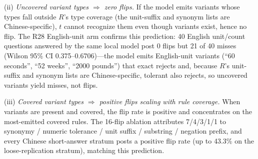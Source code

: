 \documentclass[10pt]{article} %
\begin{document}
(ii) \emph{Uncovered variant types $\Rightarrow$ zero flips.} If the model emits variants whose types fall outside $R$'s type coverage (the unit-suffix and synonym lists are Chinese-specific), $t$ cannot recognize them even though variants exist, hence no flip. The R28 English-unit arm confirms this prediction: 40 English unit/count questions answered by the same local model post 0 flips but 21 of 40 misses (Wilson 95\% CI 0.375--0.6706)---the model emits English-unit variants (``60 seconds'', ``52 weeks'', ``2000 pounds'') that exact rejects and, because $R$'s unit-suffix and synonym lists are Chinese-specific, tolerant also rejects, so uncovered variants yield misses, not flips.

(iii) \emph{Covered variant types $\Rightarrow$ positive flips scaling with rule coverage.} When variants are present and covered, the flip rate is positive and concentrates on the most-emitted covered rules. The 16-flip ablation attributes 7/4/3/1/1 to synonymy / numeric tolerance / unit suffix / substring / negation prefix, and every Chinese short-answer stratum posts a positive flip rate (up to 43.3\% on the loose-replication stratum), matching this prediction.
\end{document}
